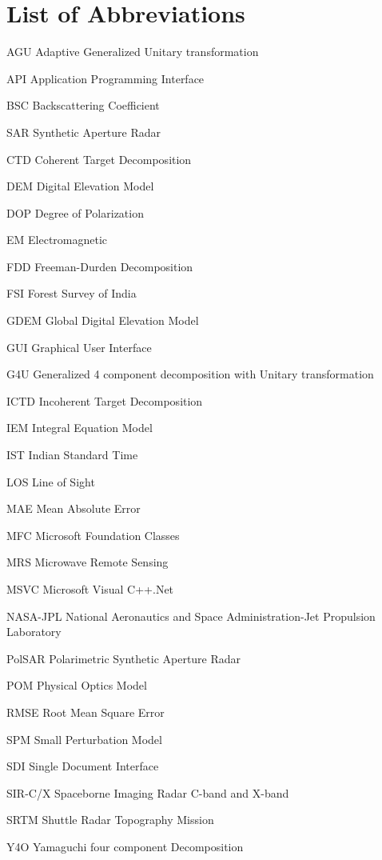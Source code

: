 \chapter*{List of Abbreviations}
\makeatletter
\newcommand{\tocfill}{\cleaders\hbox{}\hfill}
\makeatother
\newcommand{\abbrlabel}[1]{\makebox[3cm][l]{\textbf{#1}\ \tocfill}}
\newenvironment{abbreviations}{\begin{list}{}{\renewcommand{\makelabel}{\abbrlabel}
                                              \setlength{\itemsep}{0pt}}}{\end{list}}
\begin{abbreviations}
\item[AGU] 	Adaptive Generalized Unitary transformation
\item[API] Application Programming Interface
\item[BSC]	Backscattering Coefficient
\item[SAR]  Synthetic Aperture Radar  
\item[CTD]	Coherent Target Decomposition
\item[DEM] Digital Elevation Model
\item[DOP] Degree of Polarization
\item[EM] 	Electromagnetic
\item[FDD]	Freeman-Durden Decomposition
\item[FSI]   Forest Survey of India
\item[GDEM]  Global Digital Elevation Model
\item[GUI]	Graphical User Interface
\item[G4U] Generalized 4 component decomposition with Unitary transformation
\item[ICTD]  Incoherent Target Decomposition
\item[IEM] 	Integral Equation Model
\item[IST]	Indian Standard Time
\item[LOS]  Line of Sight
\item[MAE] Mean Absolute Error
\item[MFC] Microsoft Foundation Classes
\item[MRS]	Microwave Remote Sensing
\item[MSVC] Microsoft Visual C++.Net
\item[NASA-JPL]	National Aeronautics and Space Administration-Jet Propulsion Laboratory
\item[PolSAR] Polarimetric Synthetic Aperture Radar
\item[POM]	Physical Optics Model
\item[RMSE] Root Mean Square Error
\item[SPM] Small Perturbation Model
\item[SDI] Single Document Interface
\item[SIR-C/X]	Spaceborne Imaging Radar C-band and X-band
\item[SRTM] Shuttle Radar Topography Mission
\item[Y4O]	Yamaguchi four component Decomposition
\end{abbreviations}
